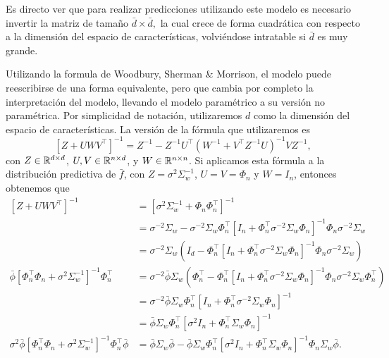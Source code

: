 Es directo ver que para realizar predicciones utilizando este modelo es necesario invertir la matriz de tamaño \(\bar{d} \times \bar{d},\) la cual crece de forma cuadrática con respecto a la dimensión del espacio de características, volviéndose intratable si \(\bar{d}\) es muy grande.

Utilizando la formula de Woodbury, Sherman \& Morrison, el modelo puede reescribirse de una forma equivalente, pero que cambia por completo la interpretación del modelo, llevando el modelo paramétrico a su versión no paramétrica. Por simplicidad de notación, utilizaremos \(d\) como la dimensión del espacio de características. La versión de la fórmula que utilizaremos es
\[\left[Z + UWV^{\top}\right]^{-1} = Z^{-1} - Z^{-1} U^{\top} \left(W^{-1} + V^{\top} Z^{-1} U\right)^{-1} V Z^{-1},\]
con \(Z \in \mathbb{R}^{d \times d}\), \(U, V\in \mathbb{R}^{n\times d}\), y \(W \in \mathbb{R}^{n\times n}\). Si aplicamos esta fórmula a la distribución predictiva de \(\bar{f}\), con \(Z = \sigma^2 \Sigma_w^{-1}\), \(U = V = \Phi_n\) y \(W = I_n\), entonces obtenemos que
\begin{align*}
	\left[Z + U W V^{\top}\right]^{-1}	&= \left[\sigma^2 \Sigma_w^{-1} + \Phi_n \Phi_n^{\top}\right]^{-1} \\
										&= \sigma^{-2} \Sigma_w - \sigma^{-2} \Sigma_w \Phi_n^{\top} \left[I_n + \Phi_n^{\top} \sigma^{-2} \Sigma_w \Phi_n\right]^{-1}\Phi_n \sigma^{-2} \Sigma_w \\
										&= \sigma^{-2} \Sigma_w \left(I_d - \Phi_n^{\top} \left[I_n + \Phi_n^{\top} \sigma^{-2} \Sigma_w \Phi_n\right]^{-1} \Phi_n \sigma^{-2} \Sigma_w \right) \\
	\bar{\phi} \left[\Phi_n^{\top} \Phi_n + \sigma^2 \Sigma_w^{-1} \right]^{-1} \Phi_n^{\top}	&= \sigma^{-2} \bar{\phi} \Sigma_w \left(\Phi_n^{\top} - \Phi_n^{\top} \left[I_n + \Phi_n^{\top} \sigma^{-2} \Sigma_w \Phi_n \right]^{-1} \Phi_n \sigma^{-2} \Sigma_w \Phi_n^{\top}\right) \\
																								&= \sigma^{-2} \bar{\phi} \Sigma_w \Phi_n^{\top} \left[I_n + \Phi_n^{\top} \sigma^{-2} \Sigma_w \Phi_n \right]^{-1} \\
																								&= \bar{\phi} \Sigma_w \Phi_n^{\top} \left[\sigma^2 I_n + \Phi_n^{\top} \Sigma_w \Phi_n \right]^{-1} \\
	\sigma^2 \bar{\phi} \left[\Phi_n^{\top} \Phi_n + \sigma^2 \Sigma_w^{-1}\right]^{-1} \Phi_n^{\top} \bar{\phi}	&= \bar{\phi} \Sigma_w \bar{\phi} - \bar{\phi} \Sigma_w \Phi_n^{\top} \left[\sigma^2 I_n + \Phi_n^{\top} \Sigma_w \Phi_n \right]^{-1} \Phi_n\Sigma_w\bar{\phi}.
\end{align*}

